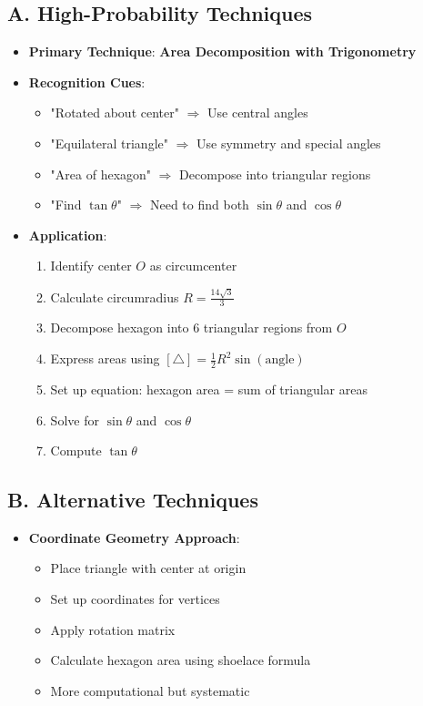\documentclass[12pt]{article}
\begin{document}
\begin{techniquesbox}
\subsection*{A. High-Probability Techniques}
\begin{itemize}[leftmargin=*]
    \item \textbf{Primary Technique}: \textbf{Area Decomposition with Trigonometry}
    
    \item \textbf{Recognition Cues}: 
    \begin{itemize}
        \item "Rotated about center" $\Rightarrow$ Use central angles
        \item "Equilateral triangle" $\Rightarrow$ Use symmetry and special angles
        \item "Area of hexagon" $\Rightarrow$ Decompose into triangular regions
        \item "Find $\tan\theta$" $\Rightarrow$ Need to find both $\sin\theta$ and $\cos\theta$
    \end{itemize}
    
    \item \textbf{Application}:
    \begin{enumerate}
        \item Identify center $O$ as circumcenter
        \item Calculate circumradius $R = \frac{14\sqrt{3}}{3}$
        \item Decompose hexagon into 6 triangular regions from $O$
        \item Express areas using $[\triangle] = \frac{1}{2}R^2\sin(\text{angle})$
        \item Set up equation: hexagon area = sum of triangular areas
        \item Solve for $\sin\theta$ and $\cos\theta$
        \item Compute $\tan\theta$
    \end{enumerate}
\end{itemize}

\subsection*{B. Alternative Techniques}
\begin{itemize}[leftmargin=*]
    \item \textbf{Coordinate Geometry Approach}:
    \begin{itemize}
        \item Place triangle with center at origin
        \item Set up coordinates for vertices
        \item Apply rotation matrix
        \item Calculate hexagon area using shoelace formula
        \item More computational but systematic
    \end{itemize}
    

\end{itemize}
\end{techniquesbox}
\end{document}
